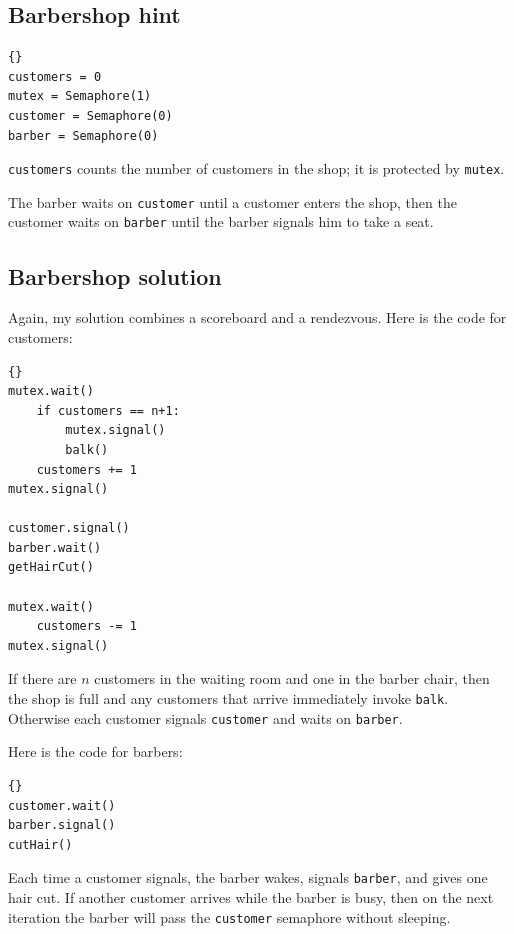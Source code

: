 \documentclass{book}
\newcommand{\clearemptydoublepage}{\newpage\cleardoublepage}
\begin{document}
\clearemptydoublepage
\subsection{Barbershop hint}

\begin{lstlisting}[caption={Barbershop hint}]{}
customers = 0
mutex = Semaphore(1)
customer = Semaphore(0)
barber = Semaphore(0)
\end{lstlisting}

{\tt customers} counts the number of customers in the shop;
it is protected by {\tt mutex}.

The barber waits on {\tt customer} until a customer enters the
shop, then the customer waits on {\tt barber} until the barber
signals him to take a seat.


\clearemptydoublepage
\subsection{Barbershop solution}

Again, my solution combines a scoreboard and a rendezvous.
Here is the code for customers:

\begin{lstlisting}[caption={Barbershop solution (customer)}]{}
mutex.wait()
    if customers == n+1:
        mutex.signal()
        balk()
    customers += 1
mutex.signal()

customer.signal()
barber.wait()        
getHairCut()

mutex.wait()
    customers -= 1
mutex.signal()
\end{lstlisting}

If there are $n$ customers in the waiting room and one in the
barber chair, then the shop is full and any customers that
arrive immediately invoke {\tt balk}.
Otherwise each customer signals {\tt customer} and waits on
{\tt barber}.

Here is the code for barbers:

\begin{lstlisting}[caption={Barbershop solution (barber)}]{}
customer.wait()
barber.signal()
cutHair()
\end{lstlisting}

Each time a customer signals,
the barber wakes, signals {\tt barber}, and gives one
hair cut.  If another customer arrives while the barber
is busy, then on the next iteration the barber will pass
the {\tt customer} semaphore without sleeping.
\end{document}
